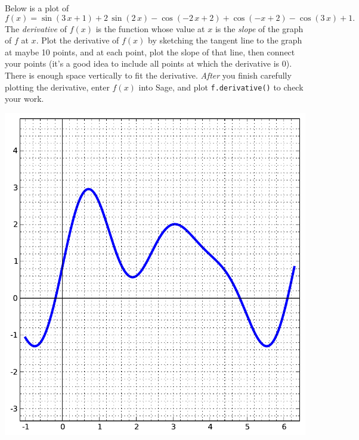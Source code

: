 Below is a plot of $$f(x)=\sin\left(3 \, x + 1\right) + 2 \, \sin\left(2 \, x\right) - \cos\left(-2 \, x + 2\right) + \cos\left(-x + 2\right) - \cos\left(3 \, x\right) + 1.$$  The {\em \color{red}derivative} of $f(x)$ is the function whose value at $x$ is the {\em slope} of the graph of $f$ at $x$.  Plot the derivative of $f(x)$ by sketching the tangent line to the graph at maybe 10 points, and at each point, plot the slope of that line, then connect your points (it's a good idea to include all points at which the derivative is 0).  There is enough space vertically to fit the derivative.  {\em After} you finish carefully plotting the derivative, enter $f(x)$ into Sage, and plot {\color{blue}\verb|f.derivative()|} to check your work.
\begin{center}\includegraphics{functions/61.pdf}\end{center}\newpage

